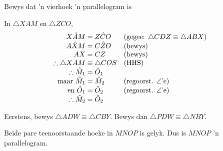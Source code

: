 \begin{wex}{Bewys dat 'n vierhoek 'n parallelogram is}
{In $\triangle XAM$ en $\triangle ZCO$, \\
\begin{equation*}
 \begin{array}{r@{\;}l@{\quad}l}
X\hat{A}M &= Z\hat{C}O & \mbox{(gegee: } \triangle CDZ \equiv \triangle ABX) \\
A\hat{X}M &= C\hat{Z}O & \mbox{(bewys)} \\
AX &= CZ & \mbox{(bewys)} \\
\therefore \triangle XAM &\equiv \triangle COS & \mbox{(HHS)} \\
\therefore \hat{M}_{1} &= \hat{O}_{1} & \\
\mbox{maar }\hat{M}_1 &= \hat{M}_2 & \mbox{(regoorst. $\angle$'e)} \\
\mbox{en }\hat{O}_{1} &= \hat{O}_2 & \mbox{(regoorst. $\angle$'e)} \\
\therefore \hat{M}_2 &= \hat{O}_{2} & 
 \end{array}
\end{equation*}


  Eerstens, bewys $\triangle ADW \equiv \triangle CBY$. Bewys dan $\triangle
  PDW \equiv \triangle NBY$.

Beide pare teenoorstaande hoeke in $MNOP$ is gelyk. Dus is $MNOP$  'n parallelogram.
}
\end{wex}



